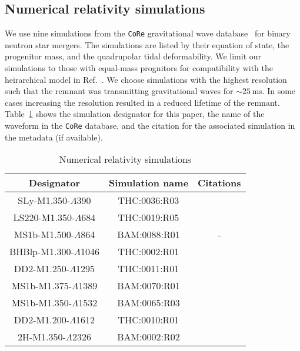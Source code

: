 \documentclass[../Thesis.tex]{subfiles}
\begin{document}
\raggedbottom
\begin{subappendices}
\renewcommand\thefigure{\thesection.\arabic{figure}} 
\renewcommand\thetable{\thesection.\arabic{table}} 
\setcounter{figure}{0} 
\setcounter{table}{0} 
\section{Numerical relativity simulations}
\label{appendix:a2}
We use nine simulations from the \texttt{CoRe} gravitational wave database~\cite{Dietrich2018} for binary neutron star mergers.
The simulations are listed by their equation of state, the progenitor mass, and the quadrupolar tidal deformability. 
We limit our simulations to those with equal-mass prognitors for compatibility with the heirarchical model in Ref.~\cite{Easter2019}. 
We choose simulations with the highest resolution such that the remnant was transmitting gravitational waves for $\sim 25$\,ms. 
In some cases increasing the resolution resulted in a reduced lifetime of the remnant. 
Table~\ref{tbl:NRwaveforms} shows the simulation designator for this paper, the name of the waveform in the \texttt{CoRe} database, and the citation for the associated simulation in the metadata (if available).
\begin{table}[H]
\centering
\caption{Numerical relativity simulations}\label{tbl:NRwaveforms}
 \begin{tabular}{|c|c|c|}
 \hline
 Designator & Simulation name & Citations \cite{Dietrich2018} \\  
 \hline
 \color{Waveform1}
 SLy-M1.350-$\Lambda$390 & \color{Waveform1} THC:0036:R03 & \color{Waveform1} \cite{Radice2016}  \\ 
 \hline
 \color{Waveform2}
 LS220-M1.350-$\Lambda$684 & \color{Waveform2} THC:0019:R05 & \color{Waveform2} \cite{Radice2017} \\
 \hline
  \color{Waveform3}
 MS1b-M1.500-$\Lambda$864 & \color{Waveform3} BAM:0088:R01 & \color{Waveform3} - \\
 \hline
  \color{Waveform4}
  BHBlp-M1.300-$\Lambda$1046 & \color{Waveform4} THC:0002:R01 & \color{Waveform4} \cite{Radice2017a,Radice2018} \\
 \hline
  \color{Waveform5}
 DD2-M1.250-$\Lambda$1295 & \color{Waveform5} THC:0011:R01 &
   \color{Waveform5} \cite{Radice2017a,Radice2018} \\
   \hline
    \color{Waveform6}
  MS1b-M1.375-$\Lambda$1389 & \color{Waveform6} BAM:0070:R01 &
   \color{Waveform6} \cite{Dietrich2017b} \\
   \hline
    \color{Waveform7}
   MS1b-M1.350-$\Lambda$1532 & \color{Waveform7} BAM:0065:R03 & \color{Waveform7}
  \cite{Bernuzzi2014} \\
  \hline
   \color{Waveform8}
  DD2-M1.200-$\Lambda$1612 & \color{Waveform8} THC:0010:R01 & 
  \color{Waveform8} \cite{Radice2017a,Radice2018} \\
  \hline
   \color{Waveform9}
  2H-M1.350-$\Lambda$2326 & \color{Waveform9} BAM:0002:R02 &
  \color{Waveform9} \cite{Bernuzzi2014}\\
 \hline
\end{tabular}
\end{table}

\end{subappendices}
\end{document}
